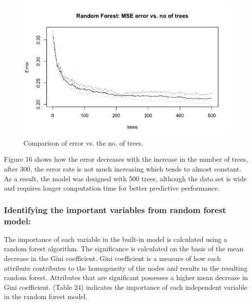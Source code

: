 \documentclass[
  a4paper,
]{article}
\begin{document}
\newpage
\begin{figure}[h!]

{\centering \includegraphics[width=0.55\linewidth]{mserf} 

}

\caption{Comparison of error vs. the no. of trees.}\label{fig:unnamed-chunk-17}
\end{figure}

Figure 16 shows how the error decreases with the increase in the number
of trees, after 300, the error rate is not much increasing which tends
to almost constant. As a result, the model was designed with 500 trees,
although the data set is wide and requires longer computation time for
better predictive performance.

\hypertarget{identifying-the-important-variables-from-random-forest-model}{%
\subsubsection{Identifying the important variables from random forest
model:}\label{identifying-the-important-variables-from-random-forest-model}}

The importance of each variable in the built-in model is calculated
using a random forest algorithm. The significance is calculated on the
basis of the mean decrease in the Gini coefficient. Gini coefficient is
a measure of how each attribute contributes to the homogeneity of the
nodes and results in the resulting random forest. Attributes that are
significant possesses a higher mean decrease in Gini coefficient. (Table
24) indicates the importance of each independent variable in the random
forest model.
\end{document}

